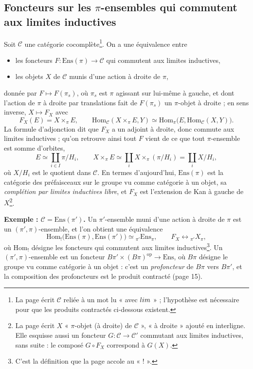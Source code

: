 \documentclass[11pt,a4paper]{article}
\begin{document}
\subsection*{Foncteurs sur les $\pi$-ensembles qui commutent aux limites inductives}

Soit $\mathcal{C}$ une catégorie cocomplète\footnote{La page écrit $\mathcal{C}$ reliée à
un mot lu « avec $\varinjlim$ » ; l'hypothèse est nécessaire pour que les produits
contractés ci-dessous existent.}. On a une équivalence entre
\begin{itemize}
  \item les foncteurs $F : \mathrm{Ens}(\pi) \to \mathcal{C}$ qui commutent aux limites
    inductives,
  \item les objets $X$ de $\mathcal{C}$ munis d'une action à droite de $\pi$,
\end{itemize}
donnée par $F \mapsto F(\pi_s)$, où $\pi_s$ est $\pi$ agissant sur lui-même à
gauche, et dont l'action de $\pi$ à droite par translations fait de $F(\pi_s)$ un
$\pi$-objet à droite ; en sens inverse, $X \mapsto F_X$ avec
\[
F_X(E) = X \times_\pi E, \qquad
\mathrm{Hom}_{\mathcal{C}}(X \times_\pi E, Y) \simeq \mathrm{Hom}_\pi\bigl(E, \mathrm{Hom}_{\mathcal{C}}(X, Y)\bigr).
\]
La formule d'adjonction dit que $F_X$ a un adjoint à droite, donc commute aux
limites inductives ; qu'on retrouve ainsi tout $F$ vient de ce que tout
$\pi$-ensemble est somme d'orbites,
\[
E \simeq \coprod_{i \in I} \pi/H_i, \qquad
X \times_\pi E \simeq \coprod_{i} X \times_\pi (\pi/H_i) = \coprod_i X/H_i ,
\]
où $X/H_i$ est le quotient dans $\mathcal{C}$. En termes d'aujourd'hui,
$\mathrm{Ens}(\pi)$ est la catégorie des préfaisceaux sur le groupe vu comme
catégorie à un objet, sa \emph{complétion par limites inductives libre}, et $F_X$
est l'extension de Kan à gauche de $X$\footnote{La page écrit $X$ « $\pi$-objet (à
droite) de $\mathcal{C}$ », « à droite » ajouté en interligne. Elle esquisse aussi
un foncteur $G : \mathcal{C} \to \mathcal{C}'$ commutant aux limites inductives, sans
suite : le composé $G \circ F_X$ correspond à $G(X)$.}.

\textbf{Exemple : $\mathcal{C} = \mathrm{Ens}(\pi')$.} Un $\pi'$-ensemble muni d'une action à
droite de $\pi$ est un $(\pi', \pi)$-ensemble, et l'on obtient une équivalence
\[
\mathrm{Hom}_{!}\bigl(\mathrm{Ens}(\pi), \mathrm{Ens}(\pi')\bigr) \simeq {}_{\pi'}\mathrm{Ens}_{\pi},
\qquad F_X \longleftrightarrow {}_{\pi'}X_{\pi},
\]
où $\mathrm{Hom}_{!}$ désigne les foncteurs qui commutent aux limites
inductives\footnote{C'est la définition que la page accole au « ! ».}. Un
$(\pi', \pi)$-ensemble est un foncteur $B\pi' \times (B\pi)^{\mathrm{op}} \to \mathrm{Ens}$, où
$B\pi$ désigne le groupe vu comme catégorie à un objet : c'est un
\emph{profoncteur} de $B\pi$ vers $B\pi'$, et la composition des profoncteurs est
le produit contracté (page 15).
\end{document}
